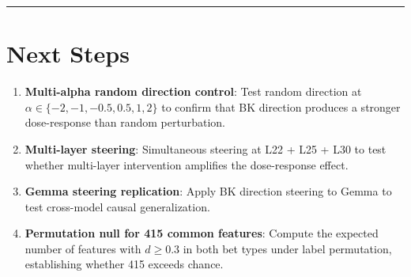 \documentclass[11pt,a4paper]{article}
\begin{document}
\bigskip\hrule\bigskip

\section{Next Steps}

\begin{enumerate}[leftmargin=2em]
    \item \textbf{Multi-alpha random direction control}: Test random direction at $\alpha \in \{-2, -1, -0.5, 0.5, 1, 2\}$ to confirm that BK direction produces a stronger dose-response than random perturbation.
    \item \textbf{Multi-layer steering}: Simultaneous steering at L22 + L25 + L30 to test whether multi-layer intervention amplifies the dose-response effect.
    \item \textbf{Gemma steering replication}: Apply BK direction steering to Gemma to test cross-model causal generalization.
    \item \textbf{Permutation null for 415 common features}: Compute the expected number of features with $d$$\geq$0.3 in both bet types under label permutation, establishing whether 415 exceeds chance.
\end{enumerate}
\end{document}
